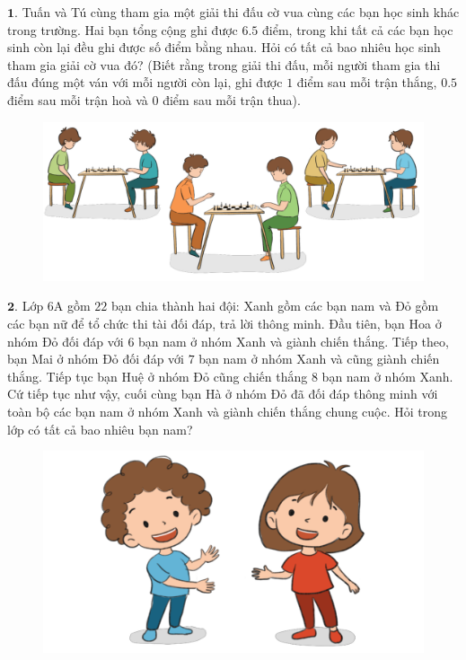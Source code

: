 \begin{multicols}{2}
	$\pmb{1.}$ Tuấn và Tú cùng tham gia một giải thi đấu cờ vua cùng các bạn học sinh khác trong trường. Hai bạn tổng cộng ghi được $6{.}5$ điểm, trong khi tất cả các bạn học sinh còn lại đều ghi được số điểm bằng nhau. Hỏi có tất cả bao nhiêu học sinh tham gia giải cờ vua đó? (Biết rằng trong giải thi đấu, mỗi người tham gia thi đấu đúng một ván với mỗi người còn lại, ghi được $1$ điểm sau mỗi trận thắng, $0{.}5$ điểm sau mỗi trận hoà và $0$ điểm sau mỗi trận thua).
	\begin{figure}[H]
		\centering
		\vspace*{-5pt}
		\captionsetup{labelformat= empty, justification=centering}
		\includegraphics[width=1\linewidth]{Hinh1}
		\vspace*{-20pt}
	\end{figure}
	$\pmb{2.}$ 	Lớp $6$A gồm $22$ bạn chia thành hai đội: Xanh gồm các bạn nam và Đỏ gồm các bạn nữ để tổ chức thi tài đối đáp, trả lời thông minh. Đầu tiên, bạn Hoa ở nhóm Đỏ đối đáp với $6$ bạn nam ở nhóm Xanh và giành chiến thắng. Tiếp theo, bạn Mai ở nhóm Đỏ đối đáp với $7$ bạn nam ở nhóm Xanh và cũng giành chiến thắng. Tiếp tục bạn Huệ ở nhóm Đỏ cũng chiến thắng $8$ bạn nam ở nhóm Xanh. Cứ tiếp tục như vậy, cuối cùng bạn Hà ở nhóm Đỏ đã đối đáp thông minh với toàn bộ các bạn nam ở nhóm Xanh và giành chiến thắng chung cuộc. Hỏi trong lớp có tất cả bao nhiêu bạn nam?
	\begin{figure}[H]
		\centering
		\vspace*{-5pt}
		\captionsetup{labelformat= empty, justification=centering}
		\includegraphics[width=1.01\linewidth]{Hinh2}

\end{figure}
\end{multicols}
